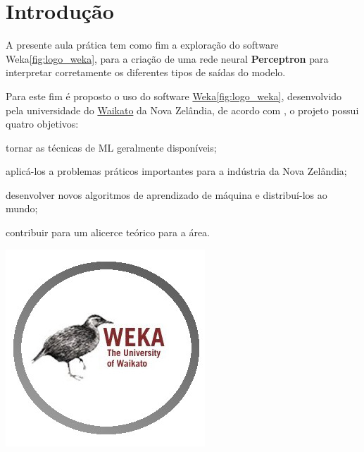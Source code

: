 
\section{Introdução}

\noindent \begin{minipage}[c]{0.6\textwidth}
  \vspace {1cm}
  \par A presente aula prática tem como fim a exploração do software Weka\ref{fig:logo_weka}, para a criação de uma rede neural \textbf{Perceptron} para interpretar corretamente os diferentes tipos de saídas do modelo.
  \par Para este fim é proposto o uso do software \href{https://www.cs.waikato.ac.nz/ml/index.html}{Weka}\ref{fig:logo_weka}, desenvolvido pela universidade do \href{https://www.waikato.ac.nz/}{Waikato} da Nova Zelândia, de acordo com , o projeto possui quatro objetivos:
  \begin{asparaenum}
    \item tornar as técnicas de ML geralmente disponíveis;
    \item aplicá-los a problemas práticos importantes para a indústria da Nova Zelândia;
    \item desenvolver novos algoritmos de aprendizado de máquina e distribuí-los ao mundo;
    \item contribuir para um alicerce teórico para a área.
  \end{asparaenum}

\end{minipage}
\begin{minipage}[c]{0.4\textwidth}

  \includegraphics[width=\textwidth]{figure/weka-logo.jpg}
  	\label{fig:logo_weka}
\end{minipage}



